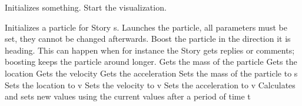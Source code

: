 
\begin{classmetadata}
\end{classmetadata}

\begin{classinterface}
    {Initializes something.}
    {Start the visualization.}
\end{classinterface}




\begin{classmetadata}
\end{classmetadata}

\begin{classinterface}
    {Initializes a particle for Story s.}
    {Launches the particle, all parameters must be set, they cannot be changed
      afterwards.}
    {Boost the particle in the direction it is heading. This can happen when
      for instance the Story gets replies or comments; boosting keeps the
      particle around longer.}
    {Gets the mass of the particle}
    {Gets the location}
    {Gets the velocity}
    {Gets the acceleration}
    {Sets the mass of the particle to s}
    {Sets the location to v}
    {Sets the velocity to v}
    {Sets the acceleration to v}
    {Calculates and sets new values using the current values after a period of
      time t}
\end{classinterface}




\begin{classmetadata}
\end{classmetadata}

